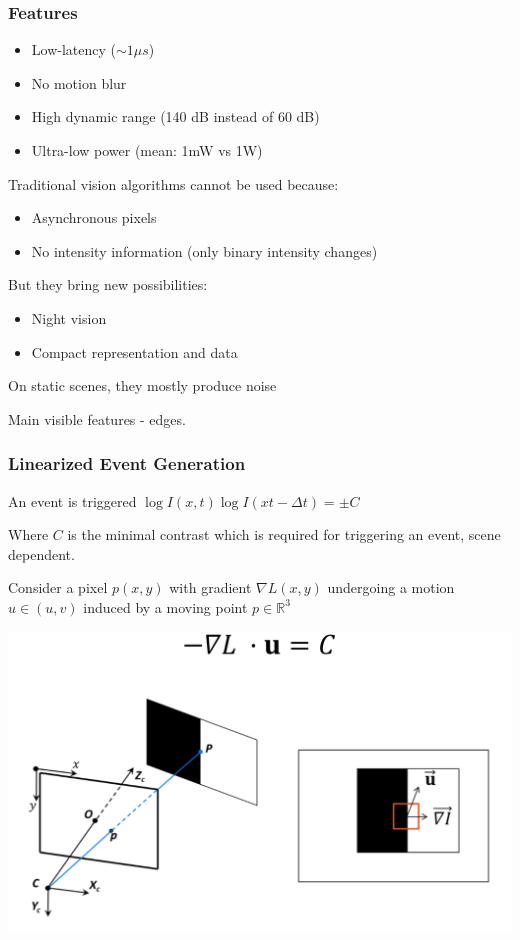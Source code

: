 \subsubsection{Features}

\begin{itemize}
\item Low-latency ($\sim1 \mu s$)
\item No motion blur
\item High dynamic range (140 dB instead of 60 dB)
\item Ultra-low power (mean: 1mW vs 1W)
\end{itemize}

Traditional vision algorithms cannot be used because:
\begin{itemize}
\item Asynchronous pixels
\item No intensity information (only binary intensity changes)
\end{itemize}

But they bring new possibilities:
\begin{itemize}
\item Night vision
\item Compact representation and data
\end{itemize}

On static scenes, they mostly produce noise

Main visible features - edges. 

\subsubsection{Linearized Event Generation}

An event is triggered $\log I(x,t) \log I(xt-\Delta t)=\pm C$

Where $C$ is the minimal contrast which is required for triggering an event, scene dependent.

Consider a pixel $p(x,y)$ with gradient $\nabla L(x,y)$ undergoing a motion $u\in(u,v)$ induced by a moving point $p \in\mathbb{R}^3 $

\includegraphics[width=0.9\columnwidth]{event_cameras_fig/event_cameras.png}

